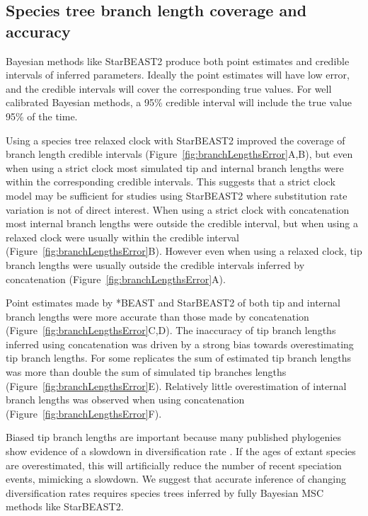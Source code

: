 \documentclass[nogrid]{MBE}%
\begin{document}
\subsection{Species tree branch length coverage and accuracy}

Bayesian methods like StarBEAST2 produce both point estimates and credible
intervals of inferred parameters. Ideally the point estimates will have low error, and the credible intervals will cover the corresponding true
values. For well calibrated Bayesian methods, a 95\% credible interval will include
the true value 95\% of the time.

Using a species tree relaxed clock with StarBEAST2 improved the coverage of
branch length credible intervals (Figure~\ref{fig:branchLengthsError}A,B), but
even when using a strict clock most simulated tip and internal branch lengths
were within the corresponding credible intervals. This suggests that a strict
clock model may be sufficient for studies using StarBEAST2 where substitution
rate variation is not of direct interest. When using a strict clock with
concatenation most internal branch lengths were outside the credible interval,
but when using a relaxed clock were usually within the credible interval
(Figure~\ref{fig:branchLengthsError}B). However even when using a relaxed
clock, tip branch lengths were usually outside the credible intervals inferred
by concatenation (Figure~\ref{fig:branchLengthsError}A).

Point estimates made by *BEAST and StarBEAST2 of both tip and internal branch
lengths were more accurate than those made by concatenation
(Figure~\ref{fig:branchLengthsError}C,D). The inaccuracy of tip branch lengths
inferred using concatenation was driven by a strong bias towards
overestimating tip branch lengths. For some replicates the sum of estimated tip
branch lengths was more than double the sum of simulated tip branches lengths
(Figure~\ref{fig:branchLengthsError}E). Relatively little overestimation of
internal branch lengths was observed when using concatenation
(Figure~\ref{fig:branchLengthsError}F).

Biased tip branch lengths are important because many published phylogenies show
evidence of a slowdown in diversification rate \citep{Moen2014190}. If the
ages of extant species are overestimated, this will artificially reduce the
number of recent speciation events, mimicking a slowdown. We suggest that
accurate inference of changing diversification rates requires species trees
inferred by fully Bayesian MSC methods like StarBEAST2.
\end{document}
